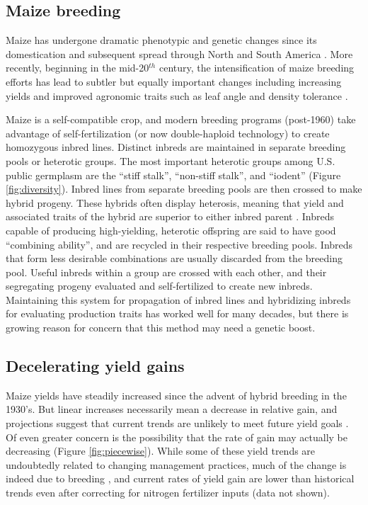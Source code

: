 \documentclass[draft,12pt]{article}
\begin{document}
\subsection*{Maize breeding}
Maize has undergone dramatic phenotypic and genetic changes since its domestication and subsequent spread through North and South America \citep{daFonseca:2015ey,Doebley:2004ce}. More recently, beginning in the mid-20$^{th}$ century, the intensification of maize breeding efforts has lead to subtler but equally important changes including increasing yields and improved agronomic traits such as leaf angle and density tolerance \citep{duvick2005contribution}. 

Maize is  a self-compatible crop, and modern breeding programs (post-1960) take advantage of self-fertilization (or now double-haploid technology) to create homozygous inbred lines. 
Distinct inbreds are maintained in separate breeding pools or heterotic groups.
The most important heterotic groups among U.S. public germplasm are the ``stiff stalk'', ``non-stiff stalk'', and ``iodent'' (Figure \ref{fig:diversity}).
Inbred lines from separate breeding pools are then crossed to make hybrid progeny.  
These hybrids often display heterosis, meaning that yield and associated traits of the hybrid are superior to  either inbred parent \citep{Springer:2007bj}.  
Inbreds capable of producing high-yielding, heterotic offspring are said to have good ``combining ability'', and are recycled in their respective breeding pools.
Inbreds that form less desirable combinations are usually discarded from the breeding pool. 
Useful inbreds within a group are crossed with each other, and their segregating progeny evaluated and self-fertilized to create new inbreds. 
Maintaining this system for propagation of inbred lines and hybridizing inbreds for evaluating production traits has worked well for many decades, but there is growing reason for concern that this method may need a genetic boost. 

\subsection*{Decelerating yield gains} 

Maize yields have steadily increased since the advent of hybrid breeding in the 1930's.
But linear increases necessarily mean a decrease in relative gain, and projections suggest that current trends are unlikely to meet future yield goals \citep{grassini2013distinguishing}. 
Of even greater concern is the possibility that the rate of gain may actually be decreasing (Figure \ref{fig:piecewise}).
While some of these yield trends are undoubtedly related to changing management practices, much of the change is indeed due to breeding \citep{Duvick:2001fy}, and current rates of yield gain are lower than historical trends even after correcting for nitrogen fertilizer inputs (data not shown). 
\end{document}
